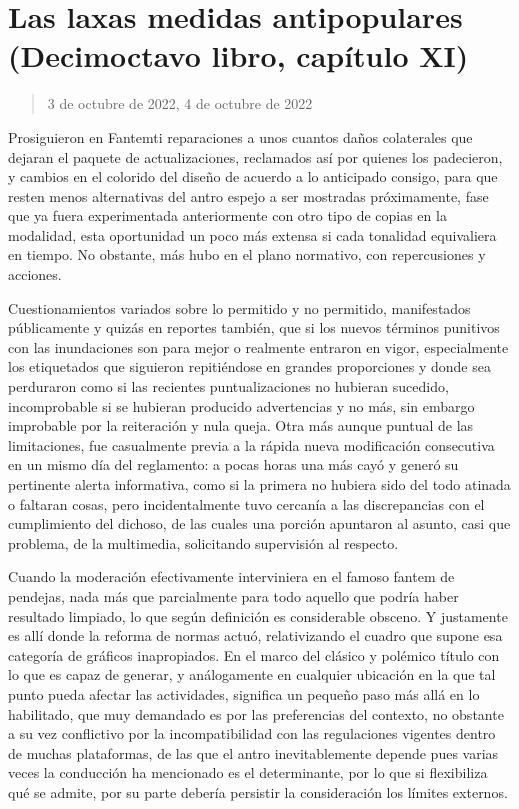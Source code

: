 \documentclass[
]{book}
\begin{document}
\hypertarget{las-laxas-medidas-antipopulares-decimoctavo-libro-capuxedtulo-xi}{%
\section{Las laxas medidas antipopulares (Decimoctavo libro, capítulo XI)}\label{las-laxas-medidas-antipopulares-decimoctavo-libro-capuxedtulo-xi}}

\begin{quote}
3 de octubre de 2022, 4 de octubre de 2022
\end{quote}

Prosiguieron en Fantemti reparaciones a unos cuantos daños colaterales que dejaran el paquete de actualizaciones, reclamados así por quienes los padecieron, y cambios en el colorido del diseño de acuerdo a lo anticipado consigo, para que resten menos alternativas del antro espejo a ser mostradas próximamente, fase que ya fuera experimentada anteriormente con otro tipo de copias en la modalidad, esta oportunidad un poco más extensa si cada tonalidad equivaliera en tiempo. No obstante, más hubo en el plano normativo, con repercusiones y acciones.

Cuestionamientos variados sobre lo permitido y no permitido, manifestados públicamente y quizás en reportes también, que si los nuevos términos punitivos con las inundaciones son para mejor o realmente entraron en vigor, especialmente los etiquetados que siguieron repitiéndose en grandes proporciones y donde sea perduraron como si las recientes puntualizaciones no hubieran sucedido, incomprobable si se hubieran producido advertencias y no más, sin embargo improbable por la reiteración y nula queja. Otra más aunque puntual de las limitaciones, fue casualmente previa a la rápida nueva modificación consecutiva en un mismo día del reglamento: a pocas horas una más cayó y generó su pertinente alerta informativa, como si la primera no hubiera sido del todo atinada o faltaran cosas, pero incidentalmente tuvo cercanía a las discrepancias con el cumplimiento del dichoso, de las cuales una porción apuntaron al asunto, casi que problema, de la multimedia, solicitando supervisión al respecto.

Cuando la moderación efectivamente interviniera en el famoso fantem de pendejas, nada más que parcialmente para todo aquello que podría haber resultado limpiado, lo que según definición es considerable obsceno. Y justamente es allí donde la reforma de normas actuó, relativizando el cuadro que supone esa categoría de gráficos inapropiados. En el marco del clásico y polémico título con lo que es capaz de generar, y análogamente en cualquier ubicación en la que tal punto pueda afectar las actividades, significa un pequeño paso más allá en lo habilitado, que muy demandado es por las preferencias del contexto, no obstante a su vez conflictivo por la incompatibilidad con las regulaciones vigentes dentro de muchas plataformas, de las que el antro inevitablemente depende pues varias veces la conducción ha mencionado es el determinante, por lo que si flexibiliza qué se admite, por su parte debería persistir la consideración los límites externos.
\end{document}
